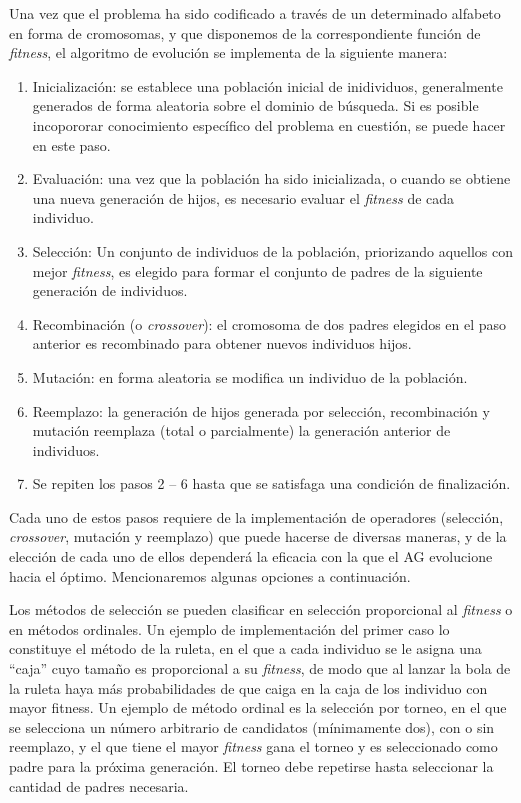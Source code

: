 Una vez que el problema ha sido codificado a través de un determinado alfabeto en forma de cromosomas, y que disponemos de la correspondiente función de \textit{fitness}, el algoritmo de evolución se implementa de la siguiente manera:

\begin{enumerate}
 \item Inicialización: se establece una población inicial de inidividuos, generalmente generados de forma aleatoria sobre el dominio de búsqueda. Si es posible incopororar conocimiento específico del problema en cuestión, se puede hacer en este paso.
 \item Evaluación: una vez que la población ha sido inicializada, o cuando se obtiene una nueva generación de hijos, es necesario evaluar el \textit{fitness} de cada individuo.
 \item Selección: Un conjunto de individuos de la población, priorizando aquellos con mejor \textit{fitness}, es elegido para formar el conjunto de padres de la siguiente generación de individuos.
 \item Recombinación (o \textit{crossover}): el cromosoma de dos padres elegidos en el paso anterior es recombinado para obtener nuevos individuos hijos.
 \item Mutación: en forma aleatoria se modifica un individuo de la población.
 \item Reemplazo: la generación de hijos generada por selección, recombinación y mutación reemplaza (total o parcialmente) la generación anterior de individuos.
 \item Se repiten los pasos 2 -- 6 hasta que se satisfaga una condición de finalización.
\end{enumerate}

Cada uno de estos pasos requiere de la implementación de operadores (selección, \textit{crossover}, mutación y reemplazo) que puede hacerse de diversas maneras, y de la elección de cada uno de ellos dependerá la eficacia con la que el AG evolucione hacia el óptimo. Mencionaremos algunas opciones a continuación.

Los métodos de selección se pueden clasificar en selección proporcional al \textit{fitness} o en métodos ordinales. Un ejemplo de implementación del primer caso lo constituye el método de la ruleta, en el que a cada individuo se le asigna una ``caja'' cuyo tamaño es proporcional a su \textit{fitness}, de modo que al lanzar la bola de la ruleta haya más probabilidades de que caiga en la caja de los individuo con mayor fitness. Un ejemplo de método ordinal es la selección por torneo, en el que se selecciona un número arbitrario de candidatos (mínimamente dos), con o sin reemplazo, y el que tiene el mayor \textit{fitness} gana el torneo y es seleccionado como padre para la próxima generación. El torneo debe repetirse hasta seleccionar la cantidad  de padres necesaria.

